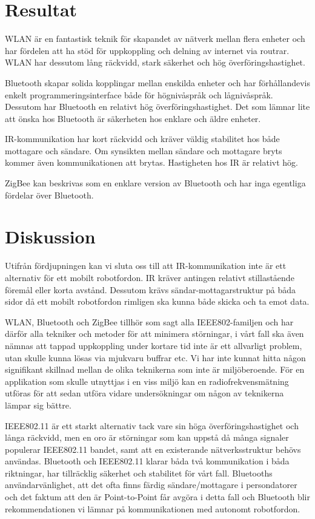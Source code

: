 \documentclass[a4paper,12pt,fleqn]{article}
\begin{document}
\newpage

\section{Resultat}
WLAN är en fantastisk teknik för skapandet av nätverk mellan flera enheter och har fördelen att ha stöd för uppkoppling och delning av internet via routrar. WLAN har dessutom lång räckvidd, stark säkerhet och hög överföringshastighet.
  
Bluetooth skapar solida kopplingar mellan enskilda enheter och har förhållandevis enkelt programmeringsinterface både för högnivåspråk och lågnivåspråk. Dessutom har Bluetooth en relativt hög överföringshastighet. Det som lämnar lite att önska hos Bluetooth är säkerheten hos enklare och äldre enheter.

IR-kommunikation har kort räckvidd och kräver väldig stabilitet hos både mottagare och sändare. Om synsikten mellan sändare och mottagare bryts kommer även kommunikationen att brytas. Hastigheten hos IR är relativt hög. 

ZigBee kan beskrivas som en enklare version av Bluetooth och har inga egentliga fördelar över Bluetooth. 

\section{Diskussion}
Utifrån fördjupningen kan vi sluta oss till att IR-kommunikation inte är ett alternativ för ett mobilt robotfordon. IR kräver antingen relativt stillastående föremål eller korta avstånd. Dessutom krävs sändar-mottagarstruktur på båda sidor då ett mobilt robotfordon rimligen ska kunna både skicka och ta emot data.

WLAN, Bluetooth och ZigBee tillhör som sagt alla IEEE802-familjen och har därför alla tekniker och metoder för att minimera störningar, i vårt fall ska även nämnas att tappad uppkoppling under kortare tid inte är ett allvarligt problem, utan skulle kunna lösas via mjukvaru buffrar etc. Vi har inte kunnat hitta någon signifikant skillnad mellan de olika teknikerna som inte är miljöberoende. För en applikation som skulle utnyttjas i en viss miljö kan en radiofrekvensmätning utföras för att sedan utföra vidare undersökningar om någon av teknikerna lämpar sig bättre.

IEEE802.11 är ett starkt alternativ tack vare sin höga överföringshastighet och långa räckvidd, men en oro är störningar som kan uppstå då många signaler populerar IEEE802.11 bandet, samt att en existerande nätverksstruktur behövs användas.
Bluetooth och IEEE802.11 klarar båda två kommunikation i båda riktningar, har tillräcklig säkerhet och stabilitet för vårt fall. Bluetooths användarvänlighet, att det ofta finns färdig sändare/mottagare i persondatorer och det faktum att den är Point-to-Point får avgöra i detta fall och Bluetooth blir rekommendationen vi lämnar på kommunikationen med autonomt robotfordon.
\end{document}
